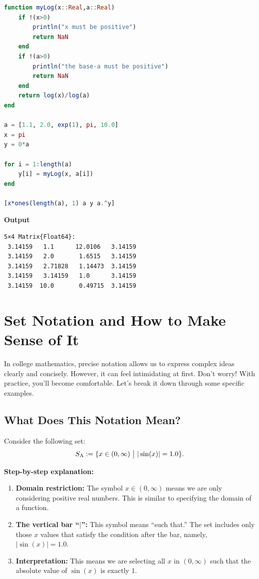 \begin{lstlisting}[language=Julia,style=mystyle]
function myLog(x::Real,a::Real)
    if !(x>0)
        println("x must be positive")
        return NaN
    end
    if !(a>0)
        println("the base-a must be positive")
        return NaN
    end
    return log(x)/log(a)
end

a = [1.1, 2.0, exp(1), pi, 10.0]
x = pi
y = 0*a

for i = 1:length(a)
    y[i] = myLog(x, a[i])
end

[x*ones(length(a), 1) a y a.^y] 
\end{lstlisting}
\textbf{Output} 
\begin{verbatim}
5×4 Matrix{Float64}:
 3.14159   1.1      12.0106   3.14159
 3.14159   2.0       1.6515   3.14159
 3.14159   2.71828   1.14473  3.14159
 3.14159   3.14159   1.0      3.14159
 3.14159  10.0       0.49715  3.14159
\end{verbatim}

\Qed


\section{Set Notation and How to Make Sense of It}

In college mathematics, precise notation allows us to express complex ideas clearly and concisely. However, it can feel intimidating at first. Don't worry! With practice, you'll become comfortable. Let's break it down through some specific examples.

\subsection*{What Does This Notation Mean?}

Consider the following set:
\[
S_{\rm A} := \{ x \in (0, \infty) ~\big|~ |\sin(x)| = 1.0 \}.
\]

\textbf{Step-by-step explanation:}
\begin{enumerate}
    \item \textbf{Domain restriction:} The symbol $x \in (0, \infty)$ means we are only considering positive real numbers. This is similar to specifying the domain of a function.
    \item \textbf{The vertical bar ``$\big|$'':} This symbol means ``such that.'' The set includes only those $x$ values that satisfy the condition after the bar, namely, $|\sin(x)| = 1.0$.
    \item \textbf{Interpretation:} This means we are selecting all $x$ in $(0, \infty)$ such that the absolute value of $\sin(x)$ is exactly $1$. 
\end{enumerate}

